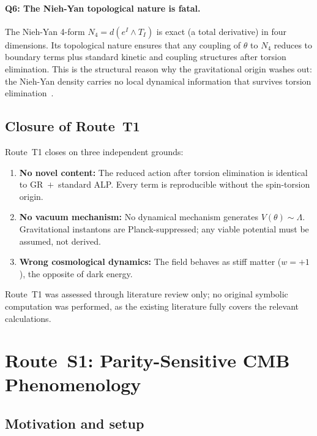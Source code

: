 \documentclass[11pt,letterpaper]{article}
\begin{document}
\paragraph{Q6: The Nieh-Yan topological nature is fatal.}
The Nieh-Yan 4-form $N_4 = d(e^I\wedge T_I)$ is exact (a total derivative)
in four dimensions. Its topological nature ensures that any coupling of
$\theta$ to $N_4$ reduces to boundary terms plus standard kinetic and
coupling structures after torsion elimination. This is the structural
reason why the gravitational origin washes out: the Nieh-Yan density
carries no local dynamical information that survives torsion
elimination~\cite{Mercuri2009,CalcagniMercuri2009}.

\subsection{Closure of Route~T1}\label{sec:T1_closure}

Route~T1 closes on three independent grounds:
\begin{enumerate}
  \item \textbf{No novel content:} The reduced action after torsion
    elimination is identical to GR~$+$~standard ALP. Every term is
    reproducible without the spin-torsion origin.
  \item \textbf{No vacuum mechanism:} No dynamical mechanism generates
    $V(\theta)\sim\Lambda$. Gravitational instantons are
    Planck-suppressed; any viable potential must be assumed, not derived.
  \item \textbf{Wrong cosmological dynamics:} The field behaves as stiff
    matter ($w=+1$), the opposite of dark energy.
\end{enumerate}

Route~T1 was assessed through literature review only; no original symbolic
computation was performed, as the existing literature fully covers the
relevant calculations.


\section{Route~S1: Parity-Sensitive CMB Phenomenology}\label{sec:S1}

\subsection{Motivation and setup}\label{sec:S1_setup}
\end{document}
